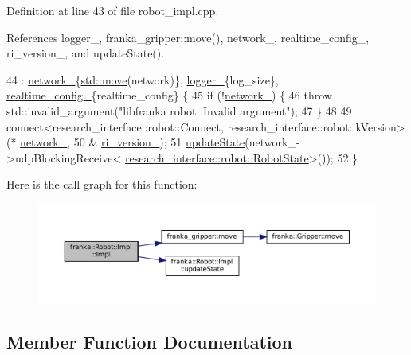 Definition at line 43 of file robot\+\_\+impl.\+cpp.



References logger\+\_\+, franka\+\_\+gripper\+::move(), network\+\_\+, realtime\+\_\+config\+\_\+, ri\+\_\+version\+\_\+, and update\+State().


\begin{DoxyCode}
44     : \hyperlink{classfranka_1_1Robot_1_1Impl_acecf3b158ccd1c2ed7e76971f1e6a192}{network\_}\{\hyperlink{namespacefranka__gripper_a1356a87108d2229401d3755bd3e53bdf}{std::move}(network)\}, \hyperlink{classfranka_1_1Robot_1_1Impl_a404078ee04a4786f61d991b71d2dc1ff}{logger\_}\{log\_size\}, 
      \hyperlink{classfranka_1_1Robot_1_1Impl_af740b3f1aca49659f5d81501f3c83cad}{realtime\_config\_}\{realtime\_config\} \{
45   \textcolor{keywordflow}{if} (!\hyperlink{classfranka_1_1Robot_1_1Impl_acecf3b158ccd1c2ed7e76971f1e6a192}{network\_}) \{
46     \textcolor{keywordflow}{throw} std::invalid\_argument(\textcolor{stringliteral}{"libfranka robot: Invalid argument"});
47   \}
48 
49   connect<research\_interface::robot::Connect, research\_interface::robot::kVersion>(*
      \hyperlink{classfranka_1_1Robot_1_1Impl_acecf3b158ccd1c2ed7e76971f1e6a192}{network\_},
50                                                                                    &
      \hyperlink{classfranka_1_1Robot_1_1Impl_a9e5d9b45a15e1e23dd09e4d2fe272833}{ri\_version\_});
51   \hyperlink{classfranka_1_1Robot_1_1Impl_a79e762e0bc2fe77fdfe7614963883be7}{updateState}(network\_->udpBlockingReceive<
      \hyperlink{structresearch__interface_1_1robot_1_1RobotState}{research\_interface::robot::RobotState}>());
52 \}
\end{DoxyCode}
Here is the call graph for this function\+:
\nopagebreak
\begin{figure}[H]
\begin{center}
\leavevmode
\includegraphics[width=350pt]{classfranka_1_1Robot_1_1Impl_a091452543a9ef4ce4e347911bc14fbc1_cgraph}
\end{center}
\end{figure}


\subsection{Member Function Documentation}
\mbox{\label{classfranka_1_1Robot_1_1Impl_a30a3ca95296656edb350c49808c74385}} 
